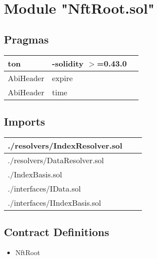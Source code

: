 
\section{Module "NftRoot.sol"}


\subsection{Pragmas}


\noindent\begin{tabular}{|l|l|p{5cm}|}\hline
ton & -solidity $>$=0.43.0 &\\\hline
AbiHeader &  expire &\\\hline
AbiHeader &  time &\\\hline
\end{tabular}


\subsection{Imports}


\noindent\begin{tabular}{|l|l|p{5cm}|}\hline
./resolvers/IndexResolver.sol &\\\hline
./resolvers/DataResolver.sol &\\\hline
./IndexBasis.sol &\\\hline
./interfaces/IData.sol &\\\hline
./interfaces/IIndexBasis.sol &\\\hline
\end{tabular}


\subsection{Contract Definitions}

\begin{itemize}
\item NftRoot
\end{itemize}
